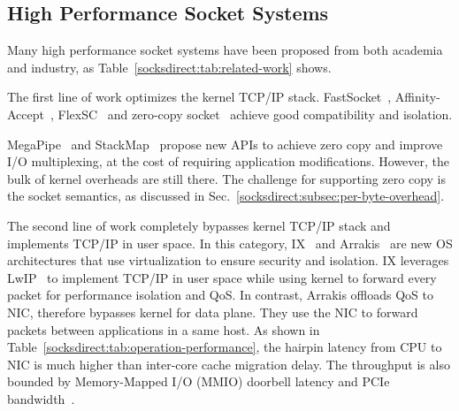 


\subsection{High Performance Socket Systems}
\label{socksdirect:subsec:related-work}




Many high performance socket systems have been proposed from both academia and industry, as Table~\ref{socksdirect:tab:related-work} shows.

 The first line of work optimizes the kernel TCP/IP stack. FastSocket~\cite{lin2016scalable}, Affinity-Accept~\cite{pesterev2012improving}, FlexSC~\cite{soares2010flexsc} and zero-copy socket~\cite{thadani1995efficient,chu1996zero,linux-zero-copy} achieve good compatibility and isolation.

MegaPipe~\cite{han2012megapipe} and StackMap~\cite{yasukata2016stackmap} propose new APIs to achieve zero copy and improve I/O multiplexing, at the cost of requiring application modifications.
However, the bulk of kernel overheads are still there.
The challenge for supporting zero copy is the socket semantics, as discussed in Sec.~\ref{socksdirect:subsec:per-byte-overhead}.

 The second line of work completely bypasses kernel TCP/IP stack and implements TCP/IP in user space.
In this category, IX~\cite{belay2017ix} and Arrakis~\cite{peter2016arrakis} are new OS architectures that use virtualization to ensure security and isolation. IX leverages LwIP~\cite{dunkels2001design} to implement TCP/IP in user space while using kernel to forward every packet for performance isolation and QoS. In contrast, Arrakis offloads QoS to NIC, therefore bypasses kernel for data plane.
They use the NIC to forward packets between applications in a same host.
As shown in Table~\ref{socksdirect:tab:operation-performance}, the hairpin latency from CPU to NIC is much higher than inter-core cache migration delay.
The throughput is also bounded by Memory-Mapped I/O (MMIO) doorbell latency and PCIe bandwidth~\cite{neugebauer2018understanding,li2017kv}.

